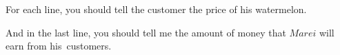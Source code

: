 For each line, you should tell the customer the price of his watermelon.

And in the last line, you should tell me the amount of money that $Marei$ will earn from his customers.